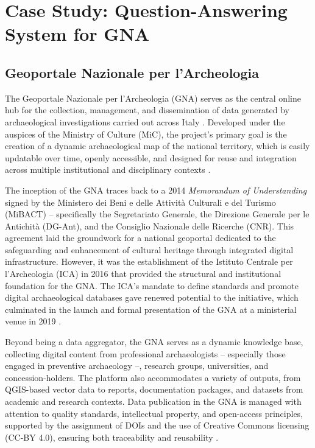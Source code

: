 \chapter{Case Study: Question-Answering System for GNA}
\label{chap:casestudy}
\sloppy
\begin{spacing}{1.5} 

\section{Geoportale Nazionale per l’Archeologia}
The Geoportale Nazionale per l'Archeologia (GNA) \citep{mic_mic_2019} serves as the central online hub for the collection, management, and dissemination of data generated by archaeological investigations carried out across Italy \citep{acconcia_pubblicazione_2023}. Developed under the auspices of the Ministry of Culture (MiC), the project's primary goal is the creation of a dynamic archaeological map of the national territory, which is easily updatable over time, openly accessible, and designed for reuse and integration across multiple institutional and disciplinary contexts \citep{falcone_dematerializzazione_2023}.

The inception of the GNA traces back to a 2014 \textit{Memorandum of Understanding} signed by the Ministero dei Beni e delle Attività Culturali e del Turismo (MiBACT) -- specifically the Segretariato Generale, the Direzione Generale per le Antichità (DG-Ant), and the Consiglio Nazionale delle Ricerche (CNR). This agreement laid the groundwork for a national geoportal dedicated to the safeguarding and enhancement of cultural heritage through integrated digital infrastructure. However, it was the establishment of the Istituto Centrale per l’Archeologia (ICA) in 2016 that provided the structural and institutional foundation for the GNA. The ICA’s mandate to define standards and promote digital archaeological databases gave renewed potential to the initiative, which culminated in the launch and formal presentation of the GNA at a ministerial venue in 2019 \citep{calandra_il_2023}.

Beyond being a data aggregator, the GNA serves as a dynamic knowledge base, collecting digital content from professional archaeologists -- especially those engaged in preventive archaeology --, research groups, universities, and concession-holders. The platform also accommodates a variety of outputs, from QGIS-based vector data to reports, documentation packages, and datasets from academic and research contexts. Data publication in the GNA is managed with attention to quality standards, intellectual property, and open-access principles, supported by the assignment of DOIs and the use of Creative Commons licensing (CC-BY 4.0), ensuring both traceability and reusability \citep{acconcia_pubblicazione_2023,falcone_dematerializzazione_2023,boi_il_2023}.


\end{spacing}
